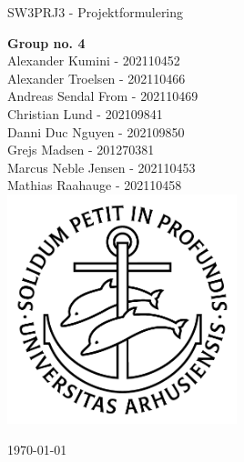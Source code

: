 \begin{titlepage}
    \begin{center}
    
        \vspace*{30mm}
        \Huge
        SW3PRJ3 - Projektformulering
        
        \vspace{10mm}
        \large
    
        \large
        \textbf{Group no. 4} \\
        Alexander Kumini - 202110452 \\
        Alexander Troelsen - 202110466 \\
        Andreas Sendal From - 202110469 \\
        Christian Lund - 202109841 \\
        Danni Duc Nguyen - 202109850 \\
        Grejs Madsen - 201270381 \\
        Marcus Neble Jensen - 202110453 \\
        Mathias Raahauge - 202110458 \\
        
        \vspace{10mm}
        \includegraphics[width=0.5\textwidth]{images/ausegl.png}
        
        \vfill
        \small
        \today
        
    \end{center}
\end{titlepage}